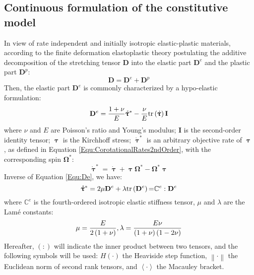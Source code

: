 \subsection{Continuous formulation of the constitutive model}
In view of rate independent and initially isotropic elastic-plastic materials, according to the finite deformation elastoplastic theory postulating the additive decomposition of the stretching tensor ${\mathbf{D}}$ into the elastic part ${{\mathbf{D}}^e}$ and the plastic part ${{\mathbf{D}}^p}$:
\begin{equation}
{\mathbf{D}} = {{\mathbf{D}}^e} + {{\mathbf{D}}^p}
\end{equation}
Then, the elastic part ${{\mathbf{D}}^e}$ is commonly characterized by a hypo-elastic formulation:
\begin{equation}
\label{Equ:De}
{{\mathbf{D}}^e} = \frac{{1 + \nu }}{E}{\mathring {\bm{\uptau }}^{*}} - \frac{\nu }{E}\rm{tr}\left( {{\bm{\dot \uptau }}} \right){\mathbf{I}}
\end{equation}
where $\nu$ and $E$ are Poisson's ratio and Young's modulus; ${\mathbf{I}}$ is the second-order identity tensor; $\bm{\uptau}$ is the Kirchhoff stress; ${\mathring {\bm{\uptau }}^{*}}$ is an arbitrary objective rate of $\bm{\uptau}$, as defined in Equation \ref{Equ:CorotationalRates2ndOrder}, with the corresponding spin ${{\mathbf{\Omega }}^*}$:
\begin{equation}
{\mathring {\bm{\uptau }}^{*}} = \dot {\bm{\uptau }}  + \bm{\uptau } {{\mathbf{\Omega }}^*} - {{\mathbf{\Omega }}^*}\bm{\uptau }
\end{equation}
Inverse of Equation \ref{Equ:De}, we have:
\begin{equation}
{\mathring {\bm{\uptau }}^{*}} = 2\mu {{\mathbf{D}}^e} + \lambda {\rm{tr}}\left( {{{\mathbf{D}}^e}} \right){\rm{ = }}{\mathbb{C}^e}:{{\mathbf{D}}^e}
\end{equation}
where ${\mathbb{C}}^e$ is the fourth-ordered isotropic elastic stiffness tensor, $\mu$ and $\lambda$ are the Lam\'{e} constants:
\begin{equation}
\mu  = \frac{E}{{2\left( {1 + \nu } \right)}},{\rm{  }}\lambda  = \frac{{E\nu }}{{\left( {1 + \nu } \right)\left( {1 - 2\nu } \right)}}
\end{equation}
Hereafter, $\left(:\right)$ will indicate the inner product between two tensors, and the following symbols will be used: $H\left(\cdot\right)$ the Heaviside step function, $\left\|\cdot\right\|$ the Euclidean norm of second rank tensors, and $\left<\cdot\right>$ the Macauley bracket.\\
